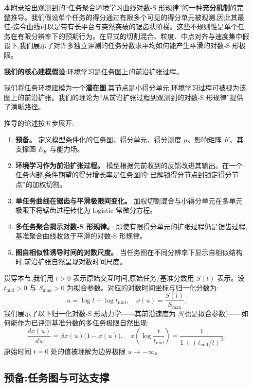 本附录给出观测到的``任务聚合环境学习曲线对数-S 形规律''的一种\textbf{充分机制}的完整推导。我们假设单个任务的得分通过有限多个可见的得分单元被观测,因此其最佳-迄今曲线可以是带有长平台与突然突破的锯齿状阶梯。这些不规则性是单个任务在有限分辨率下的预期行为。在显式的切割混合、粒度、中点对齐与速度集中假设下,我们展示了对许多独立评测的任务分数求平均如何能产生平滑的对数-S 形极限。

\textbf{我们的核心建模假设}:环境学习是任务图上的前沿扩张过程。

我们将任务环境建模为一个\textbf{潜在图},其节点是小得分单元,环境学习过程可被视为该图上的前沿扩张。我们的理论为``从前沿扩张过程到观测到的对数-S 形规律''提供了清晰路径。

推导的论述按五步展开:
\begin{enumerate}
    \item \textbf{预备。} 定义模型条件化的任务图、得分单元、得分测度 $\mu$、影响矩阵 $K$、其支撑图 $E_{K}$ 与能力场。
    \item \textbf{环境学习作为前沿扩张过程。} 模型根据先前收到的反馈改进其输出。在一个任务内部,条件期望的得分增长率是任务图的``已解锁得分节点到锁定得分节点''的加权切割。
    \item \textbf{单任务曲线在锯齿与平滑极限间变化。} 加权切割混合与小得分单元在多单元极限下将锯齿过程转化为 logistic 常微分方程。
    \item \textbf{多任务聚合揭示对数-S 形规律。} 即使有限得分单元的扩张过程仍是锯齿过程,基准聚合曲线收敛于平滑的对数-S 形规律。
    \item \textbf{图自相似性诱导时间的对数尺度。} 当任务图在不同分辨率下显示自相似结构时,前沿扩张自然呈现对数时间尺度。
\end{enumerate}

贯穿本节,我们用 $t > 0$ 表示原始交互时间,原始任务/基准分数用 $S(t)$ 表示。设 $t_{\mathrm{mid}} > 0$ 与 $S_{\max} > 0$ 为拟合参数。对应的对数时间坐标与归一化分数为:
\[
    u = \log t - \log t_{\mathrm{mid}}, \quad x(u) = \frac{S(t)}{S_{\max}}.
\]
我们展示了以下归一化对数-S 形动力学——其前沿速度为 $\beta$(也是拟合参数)——如何能作为已评测基准分数的多任务极限自然出现:
\[
    \frac{dx(u)}{du} = \beta x(u)\bigl(1 - x(u)\bigr), \quad
    x\!\left(\log\frac{t}{t_{\mathrm{mid}}}\right) = \frac{1}{1 + (t_{\mathrm{mid}}/t)^{\beta}}.
\]
原始时间 $t = 0$ 处的值被理解为边界极限 $u \to -\infty$。

\subsection{预备:任务图与可达支撑}
\label{app:prelim}

